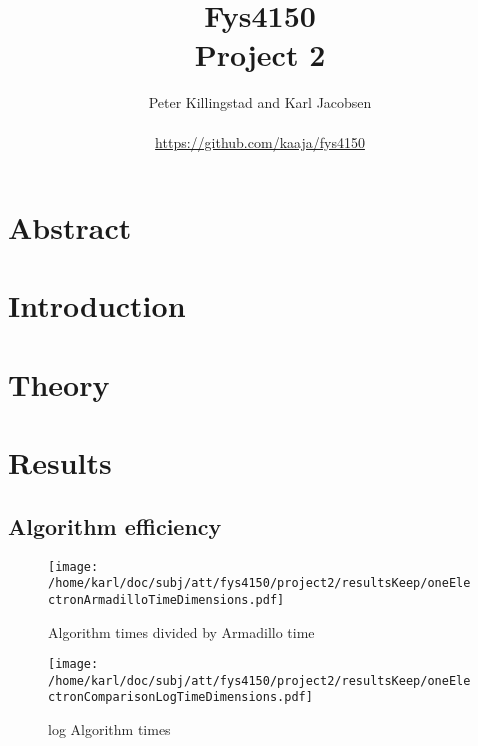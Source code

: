 \documentclass{article}
\title{Fys4150\\Project 2\\ }
\author{Peter Killingstad and Karl Jacobsen\\
\\
\url{https://github.com/kaaja/fys4150}}
\begin{document}
	
\maketitle

\section*{Abstract}


\section{Introduction}


\section{Theory}




\section{Results}

\subsection{Algorithm efficiency}

\begin{minipage}{.49\textwidth} %
	\begin{figure}[H]
		\centering
		\texttt{[image: /home/karl/doc/subj/att/fys4150/project2/resultsKeep/oneElectronArmadilloTimeDimensions.pdf]}
		\caption{Algorithm times divided by Armadillo time}
		\label{1}
	\end{figure}
\end{minipage}\hfill
\begin{minipage}{.49\textwidth}
	\begin{figure}[H]
		\centering
		\texttt{[image: /home/karl/doc/subj/att/fys4150/project2/resultsKeep/oneElectronComparisonLogTimeDimensions.pdf]}
		\caption{log Algorithm times}
		\label{1}
	\end{figure}
\end{minipage}\hfill
\end{document}
